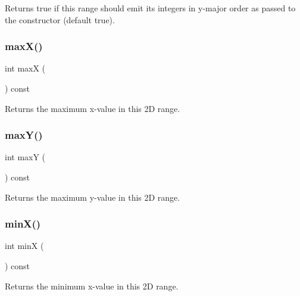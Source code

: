 Returns true if this range should emit its integers in y-\/major order as passed to the constructor (default true). 

\mbox{\label{classIntRange2D_aa9493e60175cb4e130ae4cfba2b55907}} 
\subsubsection{\texorpdfstring{max\+X()}{maxX()}}
{\footnotesize\ttfamily int maxX (\begin{DoxyParamCaption}{ }\end{DoxyParamCaption}) const}



Returns the maximum x-\/value in this 2D range. 

\mbox{\label{classIntRange2D_a015dcf4989cbafff40d5a345b9d9f959}} 
\subsubsection{\texorpdfstring{max\+Y()}{maxY()}}
{\footnotesize\ttfamily int maxY (\begin{DoxyParamCaption}{ }\end{DoxyParamCaption}) const}



Returns the maximum y-\/value in this 2D range. 

\mbox{\label{classIntRange2D_a1a1724b4b31e3d3d251e5816c7d9e448}} 
\subsubsection{\texorpdfstring{min\+X()}{minX()}}
{\footnotesize\ttfamily int minX (\begin{DoxyParamCaption}{ }\end{DoxyParamCaption}) const}



Returns the minimum x-\/value in this 2D range. 

\mbox{\label{classIntRange2D_a2337641dec44ff553785d9c143c3aafd}} 
